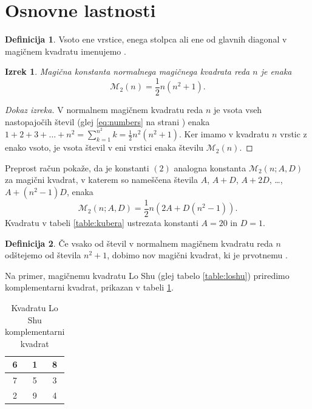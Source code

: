 \documentclass[a4paper,12pt]{article}
\theoremstyle{definition}
\newtheorem{definicija}{Definicija}
\theoremstyle{plain}
\newtheorem{izrek}{Izrek}
\newcommand{\m}{\mathcal{M}_2}
\newcommand{\pojem}[1]{\emph{\color{purple}{#1}}}
\newenvironment{dokaz}{\begin{proof}[Dokaz izreka]}{\end{proof}}
\newenvironment{magic}[3]
   {\begin{table}[!ht]
      \caption{#2}
      \label{#3}
      \centering
      \begin{tabular}{|*{#1}{c|}}
      \hline}
   {\end{tabular}\end{table}}
\begin{document}

\section{Osnovne lastnosti}

\begin{definicija}
      Vsoto ene vrstice, enega stolpca ali ene od glavnih diagonal
      v magičnem kvadratu imenujemo \pojem{magična konstanta}.
\end{definicija}

\begin{izrek}
   Magična konstanta normalnega magičnega kvadrata reda $n$
   je enaka
   \begin{equation}
      \label{eq:mc}
      \m(n) = \frac{1}{2} n(n^2+1).
   \end{equation}
\end{izrek}

\begin{dokaz}
   V normalnem magičnem kvadratu reda $n$ je vsota vseh nastopajočih
   števil (glej \ref{eq:numbers} na strani \pageref{eq:numbers}) enaka
   $1+2+3+\dots+n^2=\sum_{k=1}^{n^2}k=\frac{1}{2}n^2(n^2+1)$. Ker imamo
   v kvadratu $n$ vrstic z enako vsoto, je vsota števil v eni vrstici
   enaka številu $\m(n)$. %
\end{dokaz}

Preprost račun pokaže, da je konstanti $(2)$ analogna konstanta
$\m(n;A,D)$ za magični kvadrat, v katerem so nameščena števila
$A$, $A+D$, $A+2D$, \dots, $A+(n^2-1)D$, enaka %
\begin{equation}
   \m(n;A,D) = \frac{1}{2} n\left(2A+D(n^2-1)\right).
\end{equation}
Kvadratu v tabeli \ref{table:kubera} ustrezata konstanti $A=20$ in $D=1$.

\begin{definicija}
      Če vsako od števil v normalnem magičnem kvadratu reda $n$ odštejemo
      od števila $n^2+1$, dobimo nov magični kvadrat, ki je prvotnemu
      \pojem{komplementaren}.
\end{definicija}

Na primer, magičnemu kvadratu Lo Shu (glej tabelo \ref{table:loshu}) priredimo
komplementarni kvadrat, prikazan v tabeli \ref{ttable:closhu}.
%
   \begin{magic}{3}{Kvadratu Lo Shu komplementarni kvadrat}{ttable:closhu}
      6 & 1 & 8 \\\hline
      7 & 5 & 3 \\\hline
      2 & 9 & 4 \\\hline
   \end{magic}
\end{document}
